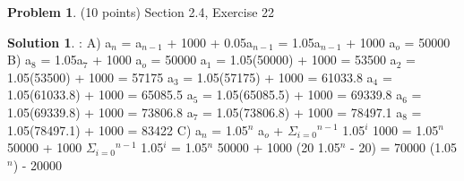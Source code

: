 \documentclass{article}
\theoremstyle{definition}
\newtheorem{problem}{Problem}
\newtheorem*{solution}{Solution}
\begin{document}
\newpage

\begin{problem} (10 points) 
Section 2.4, Exercise 22
\end{problem}
\begin{solution}:
\newline
A) a$_n$ = a$_{n-1}$ + 1000 + 0.05a$_{n-1}$
\newline
= 1.05a$_{n-1}$ + 1000
\newline
a$_o$ = 50000
\bigskip
\newline
B) a$_8$ = 1.05a$_7$ + 1000
\newline
a$_o$ = 50000
\newline
a$_1$ = 1.05(50000) + 1000 = 53500
\newline
a$_2$ = 1.05(53500) + 1000 = 57175
\newline
a$_3$ = 1.05(57175) + 1000 = 61033.8
\newline
a$_4$ = 1.05(61033.8) + 1000 = 65085.5
\newline
a$_5$ = 1.05(65085.5) + 1000 = 69339.8
\newline
a$_6$ = 1.05(69339.8) + 1000 = 73806.8
\newline
a$_7$ = 1.05(73806.8) + 1000 = 78497.1
\newline
a$_8$ = 1.05(78497.1) + 1000 = 83422
\bigskip
\newline
C) a$_n$ = 1.05$^n$ a$_o$ + $\Sigma$$_{i=0}$$^{n-1}$ 1.05$^i$ 1000
\newline
= 1.05$^n$ 50000 + 1000 $\Sigma$$_{i=0}$$^{n-1}$ 1.05$^i$ 
= 1.05$^n$ 50000 + 1000 (20 1.05$^n$ - 20)
\newline
= 70000 (1.05$^n$) - 20000
\end{solution}

\newpage
\end{document}
